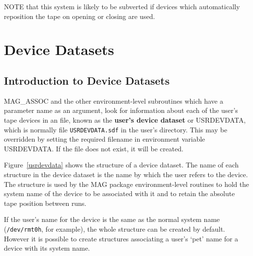 NOTE that this system is likely to be subverted if devices which automatically
reposition the tape on opening or closing are used.

\section{\label{device_datasets}Device Datasets}
\subsection{\label{dataset_intro}Introduction to Device Datasets}
MAG\_ASSOC and the other environment-level subroutines which have a
parameter name as an argument, look for information about each of the user's
tape devices in an
 file, known as the {\bf user's device dataset} or USRDEVDATA,
which is normally file {\tt USRDEVDATA.sdf} in the user's
directory.
This may be overridden by setting the required filename in environment
variable USRDEVDATA. If the file does not exist, it will be created.

Figure~\ref{usrdevdata} shows the structure of a device dataset.
The name of each structure in the device dataset is the name by which the user
refers to the device.
The structure is used by the MAG package environment-level routines to hold the
system name of the device to be associated with it and to retain the absolute
tape position between runs.

If the user's name for the device is the same as the normal system name
({\tt /dev/rmt0h}, for example), the whole structure can be created by default.
However it is possible to create structures associating a user's `pet' name
for a device with its system name.

